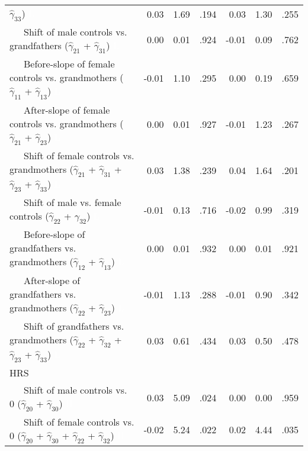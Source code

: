 \documentclass[
  english,
  man,floatsintext]{apa7}
\newenvironment{lltable}{\begin{landscape}\begin{center}\begin{ThreePartTable}}{\end{ThreePartTable}\end{center}\end{landscape}}
\begin{document}
\begin{lltable}
{\begin{longtable}{lrrrrrr}
                              $\hat{\gamma}_{33}$) \textcolor{white}{L} & 0.03 & 1.69 & .194 & 0.03 & 1.30 & .255\\
\ \ \ Shift of male controls vs. grandfathers 
                              ($\hat{\gamma}_{21}$ + $\hat{\gamma}_{31}$) \textcolor{white}{L} & 0.00 & 0.01 & .924 & -0.01 & 0.09 & .762\\
\ \ \ Before-slope of female controls vs. grandmothers 
                              ($\hat{\gamma}_{11}$ + $\hat{\gamma}_{13}$) \textcolor{white}{L} & -0.01 & 1.10 & .295 & 0.00 & 0.19 & .659\\
\ \ \ After-slope of female controls vs. grandmothers 
                              ($\hat{\gamma}_{21}$ + $\hat{\gamma}_{23}$) \textcolor{white}{L} & 0.00 & 0.01 & .927 & -0.01 & 1.23 & .267\\
\ \ \ Shift of female controls vs. grandmothers 
                              ($\hat{\gamma}_{21}$ + $\hat{\gamma}_{31}$ + 
                              $\hat{\gamma}_{23}$ + $\hat{\gamma}_{33}$) \textcolor{white}{L} & 0.03 & 1.38 & .239 & 0.04 & 1.64 & .201\\
\ \ \ Shift of male vs. female controls 
                              ($\hat{\gamma}_{22}$ + $\hat{\gamma}_{32}$) \textcolor{white}{L} & -0.01 & 0.13 & .716 & -0.02 & 0.99 & .319\\
\ \ \ Before-slope of grandfathers vs. grandmothers 
                              ($\hat{\gamma}_{12}$ + $\hat{\gamma}_{13}$) \textcolor{white}{L} & 0.00 & 0.01 & .932 & 0.00 & 0.01 & .921\\
\ \ \ After-slope of grandfathers vs. grandmothers 
                              ($\hat{\gamma}_{22}$ + $\hat{\gamma}_{23}$) \textcolor{white}{L} & -0.01 & 1.13 & .288 & -0.01 & 0.90 & .342\\
\ \ \ Shift of grandfathers vs. grandmothers 
                              ($\hat{\gamma}_{22}$ + $\hat{\gamma}_{32}$ + 
                              $\hat{\gamma}_{23}$ + $\hat{\gamma}_{33}$) \textcolor{white}{L} & 0.03 & 0.61 & .434 & 0.03 & 0.50 & .478\\
HRS &  &  &  &  &  & \\
\ \ \ Shift of male controls vs. 0 ($\hat{\gamma}_{20}$ + 
                              $\hat{\gamma}_{30}$) \textcolor{white}{H} & 0.03 & 5.09 & .024 & 0.00 & 0.00 & .959\\
\ \ \ Shift of female controls vs. 0 ($\hat{\gamma}_{20}$ + 
                              $\hat{\gamma}_{30}$ + $\hat{\gamma}_{22}$ + 
                              $\hat{\gamma}_{32}$) \textcolor{white}{H} & -0.02 & 5.24 & .022 & 0.02 & 4.44 & .035\\

\end{longtable}}
\end{lltable}
\end{document}
